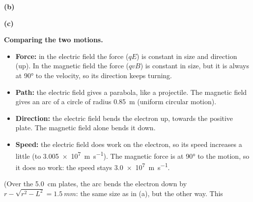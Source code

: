 \begin{practiceanswers}
\begin{practiceans}
  \textbf{(b)}

  \textbf{(c)}
  \answer{\final{$r = \qty{0.85}{m}$}}
  \begin{modelanswer}
  \textbf{Comparing the two motions.}
  \begin{itemize}
    \item \textbf{Force:} in the electric field the force ($qE$) is constant in size and
          direction (up). In the magnetic field the force ($qvB$) is constant in size, but
          it is always at \ang{90} to the velocity, so its direction keeps turning.
    \item \textbf{Path:} the electric field gives a parabola, like a projectile. The
          magnetic field gives an arc of a circle of radius \qty{0.85}{m} (uniform circular
          motion).
    \item \textbf{Direction:} the electric field bends the electron up, towards the positive
          plate. The magnetic field alone bends it down.
    \item \textbf{Speed:} the electric field does work on the electron, so its speed
          increases a little (to \qty{3.005e7}{m.s^{-1}}). The magnetic force is at \ang{90}
          to the motion, so it does no work: the speed stays \qty{3.0e7}{m.s^{-1}}.
  \end{itemize}
  (Over the \qty{5.0}{cm} plates, the arc bends the electron down by
  $r - \sqrt{r^2 - L^2} = \qty{1.5}{mm}$: the same size as in (a), but the other way. This

\end{modelanswer}
\end{practiceans}
\end{practiceanswers}
